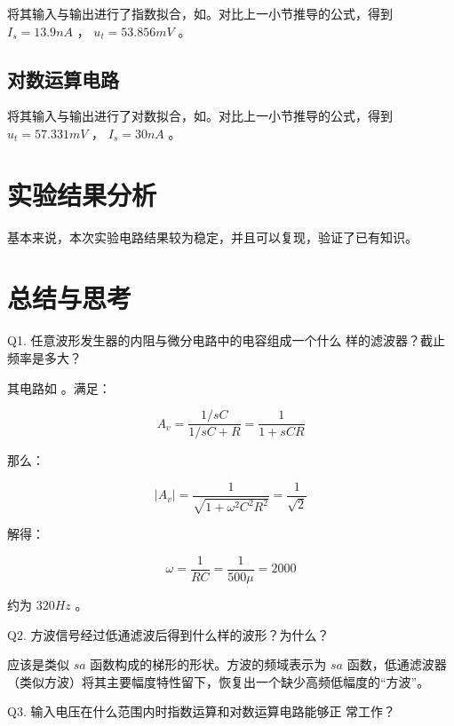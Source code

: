 \documentclass[lang=cn,11pt,a4paper,cite=authoryear]{elegantpaper}
\begin{document}
将其输入与输出进行了指数拟合，如。对比上一小节推导的公式，得到 \(I_s = 13.9 nA\) ， \(u_t = 53.856 mV\) 。



\subsection{对数运算电路}

将其输入与输出进行了对数拟合，如。对比上一小节推导的公式，得到 \(u_t = 57.331 mV\) ， \(I_s = 30 nA\) 。


\section{实验结果分析}

基本来说，本次实验电路结果较为稳定，并且可以复现，验证了已有知识。

\section{总结与思考}


Q1. 任意波形发生器的内阻与微分电路中的电容组成一个什么
样的滤波器？截止频率是多大？

其电路如  。满足：

\[A_v = \frac{1/sC}{1/sC + R} = \frac{1}{1 + s C R}\] 

那么：

\[|A_v| = \frac{1}{\sqrt{1 + \omega^2 C^2 R^2}} = \frac{1}{\sqrt{2}}\]

解得：

\[\omega = \frac{1}{RC} = \frac{1}{500 \mu} = 2000\] 

约为 \(320 Hz\) 。


Q2. 方波信号经过低通滤波后得到什么样的波形？为什么？

应该是类似 \(\mathit{sa}\) 函数构成的梯形的形状。方波的频域表示为 \(\mathit{sa}\) 函数，低通滤波器（类似方波）将其主要幅度特性留下，恢复出一个缺少高频低幅度的“方波”。

Q3. 输入电压在什么范围内时指数运算和对数运算电路能够正
常工作？




\end{document}

